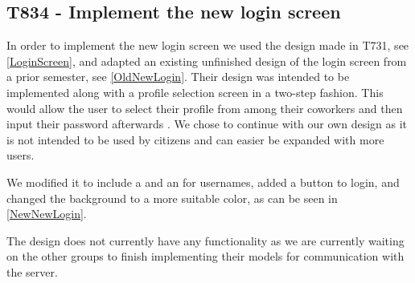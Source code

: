 \subsection{T834 - Implement the new login screen}\label{LoginXML}
In order to implement the new login screen we used the design made in T731,
see \autoref{LoginScreen}, and adapted an existing unfinished design of
the login screen from a prior semester, see \autoref{OldNewLogin}. Their design
was intended to be implemented along with a profile selection screen in
a two-step fashion. This would allow the user to select their profile from
among their coworkers and then input their password afterwards \citep[Ch.9.5,
p.68-70]{RestLogin}. We chose to continue with our own design as it is
not intended to be used by citizens and can easier be expanded with more users.


We modified it to include a  and an  for
usernames, added a button to login, and changed the background to a more
suitable color, as can be seen in \autoref{NewNewLogin}.


The design does not currently have any functionality as we are currently waiting
on the other groups to finish implementing their models for communication with
the server.

